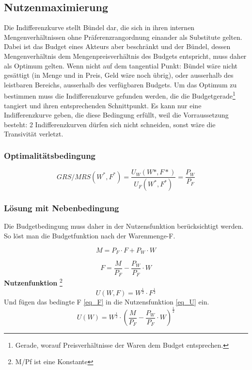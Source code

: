 
\subsection{Nutzenmaximierung}
Die Indifferenzkurve stellt Bündel dar, die sich in ihren internen Mengenverhältnissen ohne Präferenzrangordnung einander als Substitute gelten. Dabei ist das Budget eines Akteurs aber beschränkt und der Bündel, dessen Mengenverhältnis dem Mengenpreisverhältnis des Budgets entspricht, muss daher als Optimum gelten. Wenn nicht auf dem tangential Punkt: Bündel wäre nicht gesättigt (in Menge und in Preis, Geld wäre noch übrig), oder ausserhalb des leistbaren Bereichs, ausserhalb des verfügbaren Budgets.
Um das Optimum zu bestimmen muss die Indifferenzkurve gefunden werden, die die Budgetgerade\footnote{Gerade, worauf Preisverhältnisse der Waren dem Budget entsprechen. } tangiert und ihren entsprechenden Schnittpunkt.
Es kann nur eine Indifferenzkurve geben, die diese Bedingung erfüllt, weil die Vorraussetzung besteht: 2 Indifferenzkurven dürfen sich nicht schneiden, sonst wäre die Transivität verletzt.
\break
\subsubsection{Optimalitätsbedingung}
\begin{equation}
    GRS/MRS(W^*, F^*) = \frac{U_W(W*,F*)}{U_F(W^*,F^*)} = \frac{P_W}{P_F} 
\end{equation}

\pagebreak
\subsubsection{Lösung mit Nebenbedingung}
Die Budgetbedingung muss daher in der Nutzensfunktion berücksichtigt werden. So löst man die Budgetfunktion nach der Warenmenge-F.

\begin{equation}
    M = P_F \cdot F + P_W \cdot W 
\end{equation}

\begin{equation}
    \label{eq_F}
    F = \frac{M}{P_F} - \frac{P_W}{P_F} \cdot W
\end{equation}
\textbf{Nutzenfunktion} \footnote{M/Pf ist eine Konstante}
\begin{equation}
    \label{eq_U}
    U(W,F) = W^{\frac{1}{2}} \cdot F^{\frac{1}{2}}
\end{equation}
Und fügen das bedingte F \ref{eq_F} in die Nutzensfunktion \ref{eq_U} ein.
\begin{equation}
     U(W) = W^{\frac{1}{2}} \cdot {\left( \frac{M}{P_F} - \frac{P_W}{P_F} \cdot W \right)}^{\frac{1}{2}}
\end{equation}

